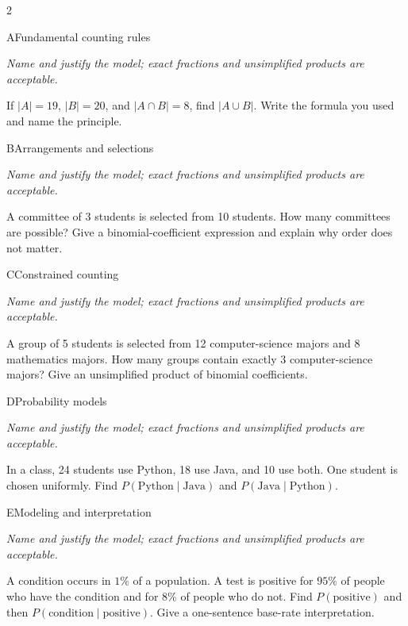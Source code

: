 \documentclass[9pt]{extarticle}
\begin{document}
\begin{multicols}{2}
\begin{CoreProblem}{A}{Fundamental counting rules}
{\scriptsize\textit{Name and justify the model; exact fractions and unsimplified products are acceptable.}\par}
If $|A|=19$, $|B|=20$, and $|A\cap B|=8$, find $|A\cup B|$. Write
    the formula you used and name the principle.
\end{CoreProblem}
\begin{CoreProblem}{B}{Arrangements and selections}
{\scriptsize\textit{Name and justify the model; exact fractions and unsimplified products are acceptable.}\par}
A committee of 3 students is selected from 10 students. How many
    committees are possible? Give a binomial-coefficient expression and explain
    why order does not matter.
\end{CoreProblem}
\begin{CoreProblem}{C}{Constrained counting}
{\scriptsize\textit{Name and justify the model; exact fractions and unsimplified products are acceptable.}\par}
A group of 5 students is selected from 12 computer-science majors and
    8 mathematics majors. How many groups contain exactly 3 computer-science
    majors? Give an unsimplified product of binomial coefficients.
\end{CoreProblem}
\columnbreak
\begin{CoreProblem}{D}{Probability models}
{\scriptsize\textit{Name and justify the model; exact fractions and unsimplified products are acceptable.}\par}
In a class, 24 students use Python, 18 use Java, and 10 use both.
    One student is chosen uniformly. Find
    $P(\text{Python}\mid\text{Java})$ and
    $P(\text{Java}\mid\text{Python})$.
\end{CoreProblem}
\begin{CoreProblem}{E}{Modeling and interpretation}
{\scriptsize\textit{Name and justify the model; exact fractions and unsimplified products are acceptable.}\par}
A condition occurs in $1\%$ of a population. A test is positive for
    $95\%$ of people who have the condition and for $8\%$ of people who do not.
    Find $P(\text{positive})$ and then
    $P(\text{condition}\mid\text{positive})$. Give a one-sentence base-rate
    interpretation.
\end{CoreProblem}
\end{multicols}
\end{document}

